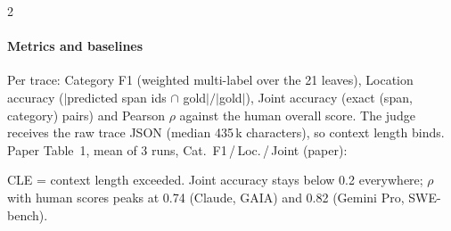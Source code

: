 \begin{multicols}{2}
\paragraph{Metrics and baselines} Per trace: Category F1 (weighted multi-label over the 21 leaves), Location accuracy ($|$predicted span ids $\cap$ gold$|/|$gold$|$), Joint accuracy (exact (span, category) pairs) and Pearson $\rho$ against the human overall score. The judge receives the raw trace JSON (median 435\,k characters), so context length binds. Paper Table~1, mean of 3 runs, Cat.\ F1\,/\,Loc.\,/\,Joint (paper):

\begin{center}\small
{}
\end{center}
CLE = context length exceeded. Joint accuracy stays below 0.2 everywhere; $\rho$ with human scores peaks at 0.74 (Claude, GAIA) and 0.82 (Gemini Pro, SWE-bench).


\end{multicols}

